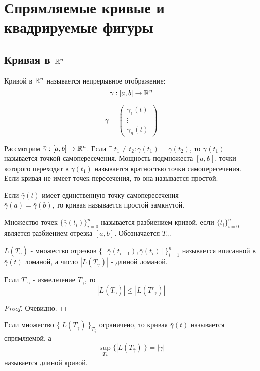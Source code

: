\section{Спрямляемые кривые и квадрируемые фигуры}
\subsection{Кривая в \texorpdfstring{$\mathbb{R}^n$}{Rn}}

\begin{definition}
    Кривой в $\mathbb{R}^n$ называется непрерывное отображение:
    \[\bar{\gamma}: [a,b]\to \mathbb{R}^n\]
\end{definition} 
\begin{comm}
    \[\bar{\gamma}=\begin{pmatrix}
       \gamma_1(t)\\
       \vdots\\
       \gamma_n(t) 
    \end{pmatrix}\]
\end{comm} 
\begin{definition}
    Рассмотрим $\bar{\gamma}: [a,b]\to \mathbb{R}^n$. Если $\exists\ t_1\ne t_2: \bar{\gamma}(t_1)=\bar{\gamma}(t_2)$, то $\bar{\gamma}(t_1)$ называется точкой самопересечения. Мощность подмножеста $[a,b]$, точки которого переходят в $\bar{\gamma}(t_1)$ называется кратностью точки самопересечения. Если кривая не имеет точек пересечения, то она называется простой.
\end{definition} 
\begin{definition}
    Если $\bar{\gamma}(t)$ имеет единственную точку самопересечения\\
    $\bar{\gamma}(a)=\bar{\gamma}(b)$, то кривая называется простой замкнутой.
\end{definition} 
\begin{definition}
    Множество точек $\{\bar{\gamma}(t_i)\}_{i=0}^n$ называется разбиением кривой, если $\{t_i\}_{i=0}^n$ является разбиением отрезка $[a,b]$. Обозначается $T_{\gamma}$.
\end{definition} 
\begin{definition}
    $L(T_{\bar{\gamma}})$ - множество отрезков $\{[\bar{\gamma}(t_{i-1}),\bar{\gamma}(t_i)]\}_{i=1}^n$ называется вписанной в $\bar{\gamma}(t)$ ломаной, а число $|L(T_{\bar{\gamma}})|$ - длиной ломаной.
\end{definition} 
\begin{statement}
    Если $T'_{\bar{\gamma}}$ - измельчение $T_{\bar{\gamma}}$, то 
    \[|L(T_{\bar{\gamma}})|\leq |L(T'_{\bar{\gamma}})|\]
\end{statement} 
\begin{proof}
    Очевидно.
\end{proof} 
\begin{definition}
    Если множество $\{|L(T_{\bar{\gamma}})|\}_{T_{\bar{\gamma}}}$ ограничено, то кривая $\bar{\gamma}(t)$ называется спрямляемой, а
    \[\sup\limits_{T_{\bar{\gamma}}}\{|L(T_{\bar{\gamma}})|\}=|\bar{\gamma}|\]
    называется длиной кривой.
\end{definition} 